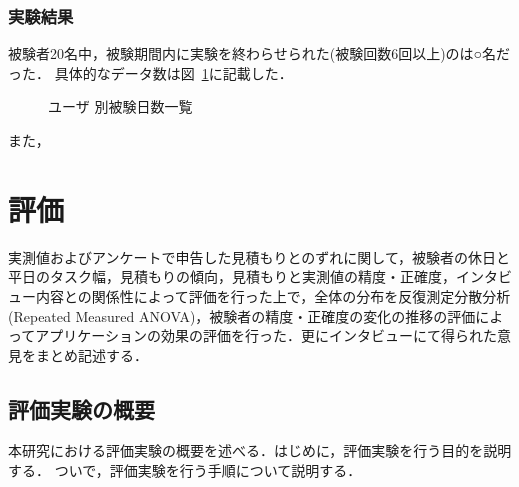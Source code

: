 \subsection{実験結果}
被験者20名中，被験期間内に実験を終わらせられた(被験回数6回以上)のは○名だった．
具体的なデータ数は図~\ref{fig:day}に記載した．
\begin{figure}[hb]
	\begin{center}
		\caption{ユーザ 別被験日数一覧}
		\label{fig:day}
	\end{center}
\end{figure}

また，

\chapter{評価}
実測値およびアンケートで申告した見積もりとのずれに関して，被験者の休日と平日のタスク幅，見積もりの傾向，見積もりと実測値の精度・正確度，インタビュー内容との関係性によって評価を行った上で，全体の分布を反復測定分散分析(Repeated Measured ANOVA)，被験者の精度・正確度の変化の推移の評価によってアプリケーションの効果の評価を行った．更にインタビューにて得られた意見をまとめ記述する．

\section{評価実験の概要}
本研究における評価実験の概要を述べる．はじめに，評価実験を行う目的を説明する．
ついで，評価実験を行う手順について説明する．

